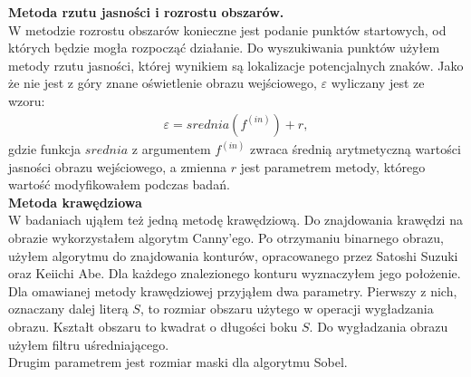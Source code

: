 \textbf{Metoda rzutu jasności i rozrostu obszarów.}\\
W metodzie rozrostu obszarów konieczne jest podanie punktów startowych, od których będzie mogła rozpocząć działanie. Do wyszukiwania punktów użyłem metody rzutu jasności, której wynikiem są lokalizacje potencjalnych znaków. Jako że nie jest z góry znane oświetlenie obrazu wejściowego, $\varepsilon$ wyliczany jest ze wzoru:
\begin{gather*}
  \varepsilon = srednia(f^{(in)}) + r,
\end{gather*}
gdzie funkcja $srednia$ z argumentem $f^{(in)}$ zwraca średnią arytmetyczną wartości jasności obrazu wejściowego, a zmienna $r$ jest parametrem metody, którego wartość modyfikowałem podczas badań. \\

\textbf{Metoda krawędziowa}\\
W badaniach ująłem też jedną metodę krawędziową. Do znajdowania krawędzi na obrazie wykorzystałem algorytm Canny'ego. Po otrzymaniu binarnego obrazu, użyłem algorytmu do znajdowania konturów, opracowanego przez Satoshi Suzuki oraz Keiichi Abe. Dla każdego znalezionego konturu wyznaczyłem jego położenie.\\
Dla omawianej metody krawędziowej przyjąłem dwa parametry. Pierwszy z nich, oznaczany dalej literą $S$, to rozmiar obszaru użytego w operacji wygładzania obrazu. Kształt obszaru to kwadrat o długości boku $S$. Do wygładzania obrazu użyłem filtru uśredniającego. \\
Drugim parametrem jest rozmiar maski dla algorytmu Sobel.
